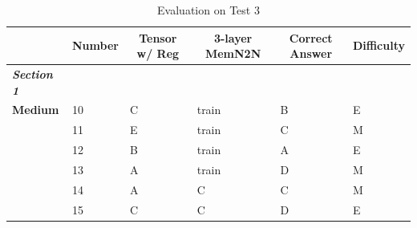 \documentclass[pageno]{jpaper}
\newcommand{\textbi}[1]{\textbf{\textit{#1}}}
\begin{document}
\begin{table}[]
\footnotesize
\centering
\caption{Evaluation on Test 3}
\label{tab: Evaluation on Test 3}
\begin{tabular}{@{}llllll@{}}
\toprule
\multicolumn{1}{c}{}    & \multicolumn{1}{c}{\textbf{Number}} & \multicolumn{1}{c}{\textbf{Tensor w/ Reg}} & \multicolumn{1}{c}{\textbf{3-layer MemN2N}} & \multicolumn{1}{c}{\textbf{Correct Answer}} & \multicolumn{1}{c}{\textbf{Difficulty}} \\ \midrule
\textbi{Section 1}      &                                     &                                            &                                             &                                             &                                         \\ \midrule
\textbf{Medium}         & 10                                  & C                                          & train                                       & B                                           & E                                       \\
\textbf{}               & 11                                  & E                                          & train                                       & C                                           & M                                       \\
\textbf{}               & 12                                  & B                                          & train                                       & A                                           & E                                       \\
\textbf{}               & 13                                  & A                                          & train                                       & D                                           & M                                       \\
\textbf{}               & 14                                  & A                                          & C                                           & C                                           & M                                       \\
\textbf{}               & 15                                  & C                                          & C                                           & D                                           & E                                       \\

\end{tabular}
\end{table}
\end{document}
